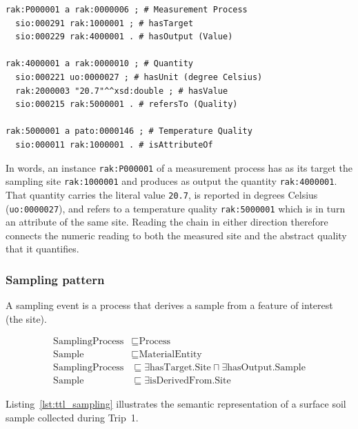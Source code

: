 \documentclass[11pt,a4paper]{article}
\begin{document}
\begin{lstlisting}[caption={Turtle representation of an environmental
  temperature measurement.},
  label={lst:ttl_temp}, basicstyle=\ttfamily\scriptsize, frame=single]
rak:P000001 a rak:0000006 ; # Measurement Process
  sio:000291 rak:1000001 ; # hasTarget
  sio:000229 rak:4000001 . # hasOutput (Value)

rak:4000001 a rak:0000010 ; # Quantity
  sio:000221 uo:0000027 ; # hasUnit (degree Celsius)
  rak:2000003 "20.7"^^xsd:double ; # hasValue
  sio:000215 rak:5000001 . # refersTo (Quality)

rak:5000001 a pato:0000146 ; # Temperature Quality
  sio:000011 rak:1000001 . # isAttributeOf
\end{lstlisting}

In words, an instance \texttt{rak:P000001} of a measurement process
has as its target the sampling site \texttt{rak:1000001} and produces
as output the quantity \texttt{rak:4000001}. That quantity carries
the literal value \texttt{20.7}, is reported in degrees Celsius
(\texttt{uo:0000027}), and refers to a temperature quality
\texttt{rak:5000001} which is in turn an attribute of the same
site. Reading the chain in either direction therefore connects the
numeric reading to both the measured site and the abstract quality
that it quantifies.

\subsubsection{Sampling pattern}

A sampling event is a process that derives a sample from a feature of
interest (the site).

\begin{align}
    \label{eq:sampling}
    \text{SamplingProcess} & \sqsubseteq \text{Process} \\
    \text{Sample} & \sqsubseteq \text{MaterialEntity} \\
    \text{SamplingProcess} & \sqsubseteq \exists
                                 \text{hasTarget}.\text{Site} \sqcap
                                 \exists
                                 \text{hasOutput}.\text{Sample} \\
    \text{Sample} & \sqsubseteq \exists \text{isDerivedFrom}.\text{Site}
\end{align}

Listing~\ref{lst:ttl_sampling} illustrates the semantic representation
of a surface soil sample collected during Trip~1.
\end{document}

